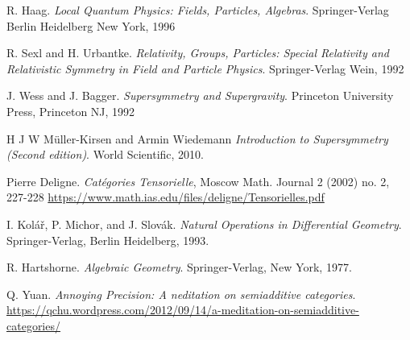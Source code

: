 \documentclass[a4paper]{report}
\theoremstyle{definition}
\theoremstyle{plain}
\theoremstyle{remark}
\begin{document}
\begin{thebibliography}{9}
   R. Haag.
    \textit{Local Quantum Physics: Fields, Particles, Algebras}.
    Springer-Verlag Berlin Heidelberg New York, 1996

   R. Sexl and H. Urbantke.
    \textit{Relativity, Groups, Particles: Special Relativity and Relativistic Symmetry in Field and Particle Physics}.
    Springer-Verlag Wein, 1992

   J. Wess and J. Bagger.
    \textit{Supersymmetry and Supergravity}.
    Princeton University Press, Princeton NJ, 1992

   H J W M{\"u}ller-Kirsen and Armin Wiedemann
    \textit{Introduction to Supersymmetry (Second edition)}.
    World Scientific, 2010.

   Pierre Deligne.
    \textit{Cat{\'e}gories Tensorielle},
    Moscow Math. Journal 2 (2002) no. 2, 227-228
    \url{https://www.math.ias.edu/files/deligne/Tensorielles.pdf}

   I. Kol\'{a}\v{r}, P. Michor, and J. Slov\'{a}k.
    \textit{Natural Operations in Differential Geometry}.
    Springer-Verlag, Berlin Heidelberg, 1993.

   R. Hartshorne.
    \textit{Algebraic Geometry}.
    Springer-Verlag, New York, 1977.

   Q. Yuan.
    \textit{Annoying Precision: A neditation on semiadditive categories}.
    \url{https://qchu.wordpress.com/2012/09/14/a-meditation-on-semiadditive-categories/}
\end{thebibliography}
\end{document}
